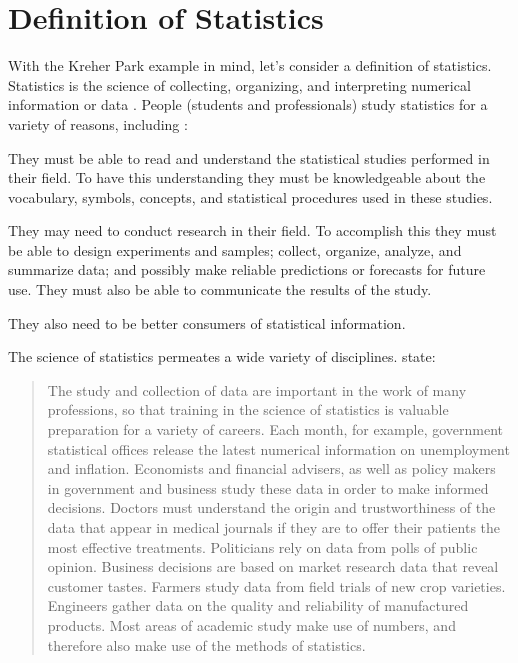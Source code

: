 \documentclass[10pt,openany]{book}\usepackage[]{graphicx}\usepackage[]{color}
\begin{document}
\section{Definition of Statistics}
With the Kreher Park example in mind, let's consider a definition of statistics.  Statistics is the science of collecting, organizing, and interpreting numerical information or data \citep{MooreMcCabe1998}.  People (students and professionals) study statistics for a variety of reasons, including \citep{Bluman2000}:
\begin{Enumerate}
  \item They must be able to read and understand the statistical studies performed in their field. To have this understanding they must be knowledgeable about the vocabulary, symbols, concepts, and statistical procedures used in these studies.
  \item They may need to conduct research in their field. To accomplish this they must be able to design experiments and samples; collect, organize, analyze, and summarize data; and possibly make reliable predictions or forecasts for future use. They must also be able to communicate the results of the study.
  \item They also need to be better consumers of statistical information.
\end{Enumerate}

The science of statistics permeates a wide variety of disciplines. \cite{MooreMcCabe1998} state:
\begin{quote}
The study and collection of data are important in the work of many professions, so that training in the science of statistics is valuable preparation for a variety of careers.  Each month, for example, government statistical offices release the latest numerical information on unemployment and inflation.  Economists and financial advisers, as well as policy makers in government and business study these data in order to make informed decisions.  Doctors must understand the origin and trustworthiness of the data that appear in medical journals if they are to offer their patients the most effective treatments. Politicians rely on data from polls of public opinion.  Business decisions are based on market research data that reveal customer tastes.  Farmers study data from field trials of new crop varieties.  Engineers gather data on the quality and reliability of manufactured products.  Most areas of academic study make use of numbers, and therefore also make use of the methods of statistics.
\end{quote}
\end{document}
